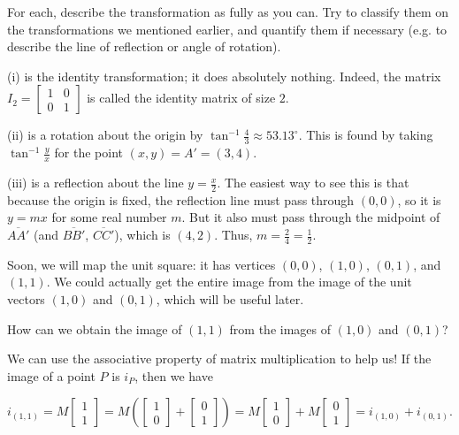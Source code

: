 \documentclass[../key.tex]{subfiles}
\begin{document}
\begin{inner_problem}
\item For each, describe the transformation as fully as you can. Try to classify them on the transformations we mentioned earlier, and quantify them if necessary (e.g. to describe the line of reflection or angle of rotation).
\end{inner_problem}

(i) is the identity transformation; it does absolutely nothing. Indeed, the matrix $I_2=\begin{bmatrix} 1 & 0 \\ 0 & 1 \end{bmatrix}$ is called the identity matrix of size $2$.

(ii) is a rotation about the origin by $\tan^{-1} \frac{4}{3} \approx 53.13^\circ$. This is found by taking $\tan^{-1} \frac{y}{x}$ for the point $(x,y)=A'=(3,4)$.

(iii) is a reflection about the line $y = \frac{x}{2}$. The easiest way to see this is that because the origin is fixed, the reflection line must pass through $(0,0)$, so it is $y =mx$ for some real number $m$. But it also must pass through the midpoint of $\overline{AA'}$ (and $\overline{BB'}$, $\overline{CC'}$), which is $(4,2)$. Thus, $m=\frac{2}{4}=\frac{1}{2}$.

\begin{outer_problem}
\item Soon, we will map the unit square: it has vertices $(0,0)$, $(1,0)$, $(0,1)$, and $(1,1)$. We could actually get the entire image from the image of the unit vectors $(1,0)$ and $(0,1)$, which will be useful later.
\end{outer_problem}

\begin{inner_problem}[start=1]
\item How can we obtain the image of $(1,1)$ from the images of $(1,0)$ and $(0,1)$?
\end{inner_problem}

We can use the associative property of matrix multiplication to help us! If the image of a point $P$ is $i_P$, then we have

$$i_{(1,1)} = M\begin{bmatrix} 1 \\ 1 \end{bmatrix} = M\left(\begin{bmatrix} 1 \\ 0 \end{bmatrix} + \begin{bmatrix} 0 \\ 1 \end{bmatrix}\right) = M\begin{bmatrix} 1 \\ 0 \end{bmatrix} + M\begin{bmatrix} 0 \\ 1 \end{bmatrix} = i_{(1,0)} + i_{(0,1)}.$$
\end{document}
